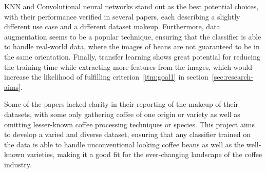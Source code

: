 KNN and Convolutional neural networks stand out as the best potential choices, with
their performance verified in several papers, each describing a slightly
different use case and a different dataset makeup.
Furthermore, data
augmentation seems to be a popular technique, ensuring that the classifier is able
to handle real-world data, where the images of beans are not guaranteed to be in
the same orientation.
Finally, transfer learning shows great potential for reducing the training time while extracting more
features from the images, which would increase the likelihood of fulfilling criterion~\ref{itm:goal1} in section~\ref{sec:research-aims}.

Some of the papers lacked clarity in their reporting of the makeup of their
datasets, with some only gathering coffee of one origin or variety as well as omitting
lesser-known coffee processing techniques or species.
This project aims to
develop a varied and diverse dataset, ensuring that any classifier trained on the
data is able to handle unconventional looking coffee beans as well as the well-known
varieties, making it a good fit for the ever-changing landscape of the coffee
industry.